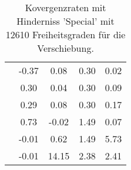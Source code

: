 \begin{table}
\begin{tabular}{c|cc|cc|}
\multicolumn{1}{|c|}{} & \multicolumn{1}{|c|}{     -0.37} & \multicolumn{1}{|c|}{      0.08} & \multicolumn{1}{|c|}{      0.30} & \multicolumn{1}{|c|}{      0.02} \\ 
\multicolumn{1}{|c|}{} & \multicolumn{1}{|c|}{      0.30} & \multicolumn{1}{|c|}{      0.04} & \multicolumn{1}{|c|}{      0.30} & \multicolumn{1}{|c|}{      0.09} \\ 
\multicolumn{1}{|c|}{} & \multicolumn{1}{|c|}{      0.29} & \multicolumn{1}{|c|}{      0.08} & \multicolumn{1}{|c|}{      0.30} & \multicolumn{1}{|c|}{      0.17} \\ 
\multicolumn{1}{|c|}{} & \multicolumn{1}{|c|}{      0.73} & \multicolumn{1}{|c|}{     -0.02} & \multicolumn{1}{|c|}{      1.49} & \multicolumn{1}{|c|}{      0.07} \\ 
\multicolumn{1}{|c|}{} & \multicolumn{1}{|c|}{     -0.01} & \multicolumn{1}{|c|}{      0.62} & \multicolumn{1}{|c|}{      1.49} & \multicolumn{1}{|c|}{      5.73} \\ 
\multicolumn{1}{|c|}{} & \multicolumn{1}{|c|}{     -0.01} & \multicolumn{1}{|c|}{     14.15} & \multicolumn{1}{|c|}{      2.38} & \multicolumn{1}{|c|}{      2.41} \\ 
\hline 
\end{tabular}\caption{Kovergenzraten mit Hinderniss 'Special' mit 12610 Freiheitsgraden für die Verschiebung.}\label{tab:Rate_Special_level5}
\end{table} 
